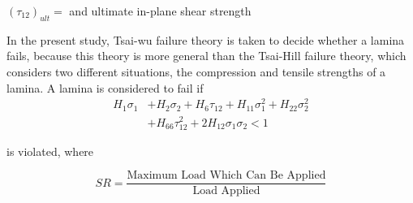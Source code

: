 $(\tau_{12})_{ult}= $ and ultimate in-plane shear strength

In the present study, Tsai-wu failure theory is taken to decide whether a lamina fails,
because this theory is more general than the Tsai-Hill failure theory, which considers two
different situations, the compression and tensile strengths of a lamina. A lamina is considered to fail
if \begin{equation} \label{eq:tsai_wu}
\begin{split}
	H_1 \sigma_1  & + H_2 \sigma_2 + H_6 \tau_{12} + H_{11}\sigma_1^2 + H_{22} \sigma_2^2 \\
				  & + H_{66}  \tau_{12}^2 + 2H_{12}\sigma_1\sigma_2 < 1
\end{split}
\end{equation}

is violated, where

\begin{equation} \label{eq:sr}S R=\frac{\text {Maximum Load Which Can Be Applied}}{\text {Load Applied}}
\end{equation}

